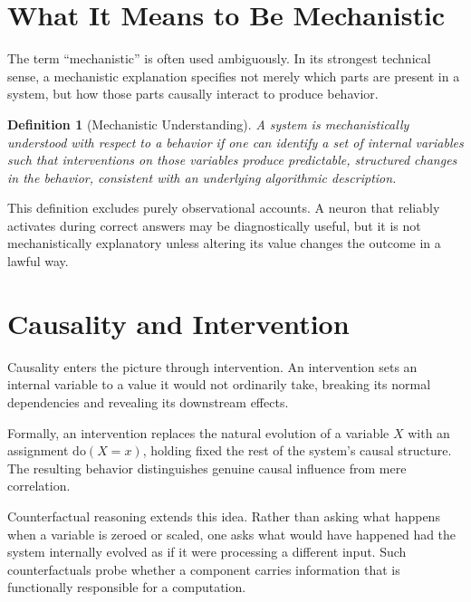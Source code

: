 \documentclass[11pt]{article}
\newtheorem{definition}{Definition}
\newcommand{\doop}{\mathrm{do}}
\begin{document}
\section{What It Means to Be Mechanistic}

The term ``mechanistic'' is often used ambiguously. In its strongest technical
sense, a mechanistic explanation specifies not merely which parts are present in
a system, but how those parts causally interact to produce behavior.

\begin{definition}[Mechanistic Understanding]
A system is mechanistically understood with respect to a behavior if one can
identify a set of internal variables such that interventions on those variables
produce predictable, structured changes in the behavior, consistent with an
underlying algorithmic description.
\end{definition}

This definition excludes purely observational accounts. A neuron that reliably
activates during correct answers may be diagnostically useful, but it is not
mechanistically explanatory unless altering its value changes the outcome in a
lawful way.

\section{Causality and Intervention}

Causality enters the picture through intervention. An intervention sets an
internal variable to a value it would not ordinarily take, breaking its normal
dependencies and revealing its downstream effects.

Formally, an intervention replaces the natural evolution of a variable $X$ with
an assignment $\doop(X = x)$, holding fixed the rest of the system’s causal
structure. The resulting behavior distinguishes genuine causal influence from
mere correlation.

Counterfactual reasoning extends this idea. Rather than asking what happens when
a variable is zeroed or scaled, one asks what would have happened had the system
internally evolved as if it were processing a different input. Such
counterfactuals probe whether a component carries information that is
functionally responsible for a computation.
\end{document}
